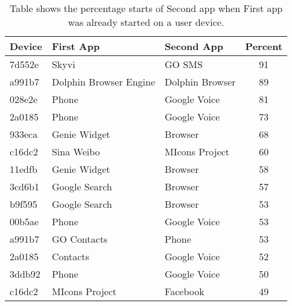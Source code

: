 
\begin{table}
\centering
\begin{tabular}{lllc}
\toprule[1.5pt]
\multicolumn{1}{l}{Device} & \multicolumn{1}{l}{First App} & \multicolumn{1}{l}{Second App} & \multicolumn{1}{c}{Percent}\\
\midrule
7d552e & Skyvi & GO SMS & 91\\ 
a991b7 & Dolphin Browser Engine & Dolphin Browser & 89\\ 
028e2e & Phone & Google Voice & 81\\ 
2a0185 & Phone & Google Voice & 73\\ 
933eca & Genie Widget & Browser & 68\\ 
c16dc2 & Sina Weibo & MIcons Project & 60\\ 
11edfb & Genie Widget & Browser & 58\\ 
3cd6b1 & Google Search & Browser & 57\\ 
b9f595 & Google Search & Browser & 53\\ 
00b5ae & Phone & Google Voice & 53\\ 
a991b7 & GO Contacts & Phone & 53\\ 
2a0185 & Contacts & Google Voice & 52\\ 
3ddb92 & Phone & Google Voice & 50\\ 
c16dc2 & MIcons Project & Facebook & 49\\ 
\bottomrule[1.5pt]
\end{tabular}
\caption{Table shows the percentage starts of Second app when First app was already started on a user device.}
\end{table}
